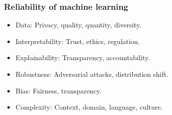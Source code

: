 \begin{frame}
    \frametitle{Reliability of machine learning}
    \begin{itemize}
        \item <1> {\color{dtured}Data}: Privacy, quality, quantity, diversity.
        \item <1> {\color{dtured}Interpretability}: Trust, ethics, regulation.
        \item <1> {\color{dtured}Explainability}: Transparency, accountability.
        \item <1> {\color{dtured}Robustness}: Adversarial attacks, distribution shift.
        \item <1> {\color{dtured}Bias}: Fairness, transparency.
        \item <1> {\color{dtured}Complexity}: Context, domain, language, culture.
    \end{itemize}

    

\end{frame}

